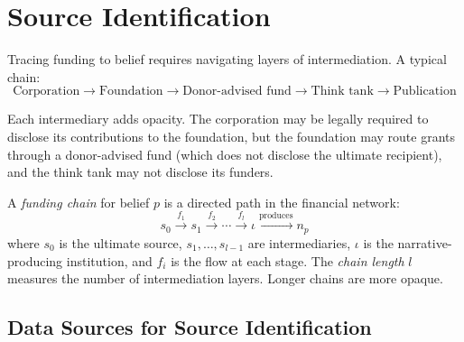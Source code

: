 \section{Source Identification}
\label{sec:ch14-sources}

Tracing funding to belief requires navigating layers of intermediation.
A typical chain:
\[
  \text{Corporation} \to \text{Foundation} \to \text{Donor-advised fund} \to \text{Think tank} \to \text{Publication}
\]

Each intermediary adds opacity.
The corporation may be legally required to disclose its contributions to the foundation, but the foundation may route grants through a donor-advised fund (which does not disclose the ultimate recipient), and the think tank may not disclose its funders.

\begin{definition}
\label{def:funding-chain}
A \emph{funding chain} for belief $p$ is a directed path in the financial network:
\[
  s_0 \xrightarrow{f_1} s_1 \xrightarrow{f_2} \cdots \xrightarrow{f_l} \iota \xrightarrow{\text{produces}} n_p
\]
where $s_0$ is the ultimate source, $s_1, \ldots, s_{l-1}$ are intermediaries, $\iota$ is the narrative-producing institution, and $f_i$ is the flow at each stage.
The \emph{chain length} $l$ measures the number of intermediation layers.
Longer chains are more opaque.
\end{definition}

\subsection{Data Sources for Source Identification}

